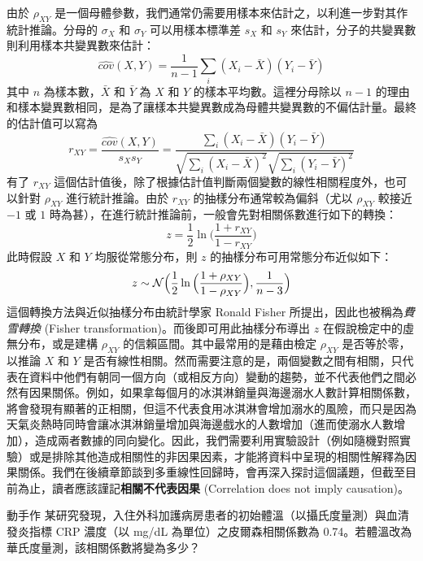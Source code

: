     由於 $\rho_{XY}$ 是一個母體參數，我們通常仍需要用樣本來估計之，以利進一步對其作統計推論。分母的 $\sigma_X$ 和 $\sigma_Y$ 可以用樣本標準差 $s_X$ 和 $s_Y$ 來估計，分子的共變異數則利用樣本共變異數來估計：
    \smallskip
    \[\widehat{cov}(X,Y) = \frac{1}{n-1}\sum_i (X_i - \bar{X})(Y_i - \bar{Y})\]
    \smallskip
    其中 $n$ 為樣本數，$\bar{X}$ 和 $\bar{Y}$ 為 $X$ 和 $Y$ 的樣本平均數。這裡分母除以 $n-1$ 的理由和樣本變異數相同，是為了讓樣本共變異數成為母體共變異數的不偏估計量。最終的估計值可以寫為
    \smallskip
    \[r_{XY} = \frac{\widehat{cov}(X,Y)}{s_X s_Y} = \frac{\sum_i (X_i - \bar{X})(Y_i - \bar{Y})}{\sqrt{\sum_i (X_i - \bar{X})^2}\sqrt{\sum_i (Y_i - \bar{Y})^2}}\]
    \smallskip
    有了 $r_{XY}$ 這個估計值後，除了根據估計值判斷兩個變數的線性相關程度外，也可以針對 $\rho_{XY}$ 進行統計推論。由於 $r_{XY}$ 的抽樣分布通常較為偏斜（尤以 $\rho_{XY}$ 較接近 $-1$ 或 $1$ 時為甚），在進行統計推論前，一般會先對相關係數進行如下的轉換：
    \smallskip
    \[z = \frac{1}{2}\ln\Big(\frac{1+r_{XY}}{1-r_{XY}}\Big)\]
    \smallskip
    此時假設 $X$ 和 $Y$ 均服從常態分布，則 $z$ 的抽樣分布可用常態分布近似如下：
    \smallskip
    \[z \sim \mathcal{N}\Big(\frac{1}{2}\ln\Big(\frac{1+\rho_{XY}}{1-\rho_{XY}}\Big), \frac{1}{n-3}\Big)\]
    \smallskip
    這個轉換方法與近似抽樣分布由統計學家 Ronald Fisher 所提出，因此也被稱為\textit{費雪轉換} (Fisher transformation)。而後即可用此抽樣分布導出 $z$ 在假說檢定中的虛無分布，或是建構 $\rho_{XY}$ 的信賴區間。其中最常用的是藉由檢定 $\rho_{XY}$ 是否等於零，以推論 $X$ 和 $Y$ 是否有線性相關。然而需要注意的是，兩個變數之間有相關，只代表在資料中他們有朝同一個方向（或相反方向）變動的趨勢，並不代表他們之間必然有因果關係。例如，如果拿每個月的冰淇淋銷量與海邊溺水人數計算相關係數，將會發現有顯著的正相關，但這不代表食用冰淇淋會增加溺水的風險，而只是因為天氣炎熱時同時會讓冰淇淋銷量增加與海邊戲水的人數增加（進而使溺水人數增加），造成兩者數據的同向變化。因此，我們需要利用實驗設計（例如隨機對照實驗）或是排除其他造成相關性的非因果因素，才能將資料中呈現的相關性解釋為因果關係。我們在後續章節談到多重線性回歸時，會再深入探討這個議題，但截至目前為止，讀者應該謹記\textbf{相關不代表因果} (Correlation does not imply causation)。

    \bigskip

    \begin{custom}{動手作}
        某研究發現，入住外科加護病房患者的初始體溫（以攝氏度量測）與血清發炎指標 CRP 濃度（以 mg/dL 為單位）之皮爾森相關係數為 0.74。若體溫改為華氏度量測，該相關係數將變為多少？
    \end{custom}

